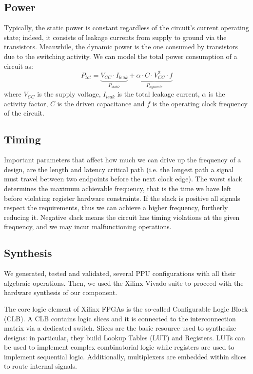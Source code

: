 \subsection{Power}
Typically, the static power is constant regardless of the circuit's current operating state; indeed, it consists of leakage currents from supply to ground via the transistors.
Meanwhile, the dynamic power is the one consumed by transistors due to the switching activity.
We can model the total power consumption of a circuit as:
\begin{equation}\label{equ:power_cmos_equation}
P_{tot} = \underbrace{V_{CC} \cdot I_{leak}}_{P_{static}} + \underbrace{\alpha \cdot C \cdot V_{CC}^2 \cdot f}_{P_{dynamic}}
\end{equation}
where $V_{CC}$ is the supply voltage, $I_{leak}$ is the total leakage current, $\alpha$ is the activity factor, $C$ is the driven capacitance and $f$ is the operating clock frequency of the circuit.



\subsection{Timing}
Important parameters that affect how much we can drive up the frequency of a design, are the length and latency critical path (i.e. the longest path a signal must travel between two endpoints before the next clock edge).
The worst slack determines the maximum achievable frequency, that is the time we have left before violating register hardware constraints.
If the slack is positive all signals respect the requirements, thus we can achieve a higher frequency, furtherly reducing it. Negative slack means the circuit has timing violations at the given frequency, and we may incur malfunctioning operations.

\subsection{Synthesis}

We generated, tested and validated, several PPU configurations with all their algebraic operations. Then, we used the Xilinx Vivado suite to proceed with the hardware synthesis of our component.

The core logic element of Xilinx FPGAs is the so-called Configurable Logic Block (CLB). A CLB contains logic slices and it is connected to the interconnection matrix via a dedicated switch. Slices are the basic resource used to synthesize designs: in particular, they build Lookup Tables (LUT) and Registers. LUTs can be used to implement complex combinatorial logic while registers are used to implement sequential logic. Additionally, multiplexers are embedded within slices to route internal signals.


